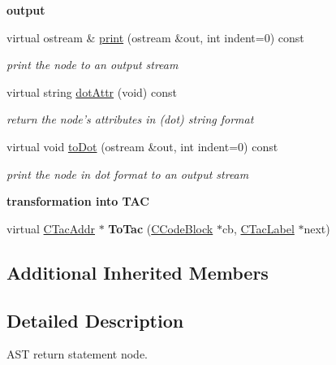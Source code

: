\begin{Indent}{\bf output}\par
\begin{DoxyCompactItemize}
\item 
virtual ostream \& \hyperlink{classCAstStatReturn_afcfe8b2012f465d3ea659f738ba157d5}{print} (ostream \&out, int indent=0) const 
\begin{DoxyCompactList}\small\item\em print the node to an output stream \end{DoxyCompactList}\item 
virtual string \hyperlink{classCAstStatReturn_af2265486c79dbea4d3945a65054a9e98}{dot\-Attr} (void) const 
\begin{DoxyCompactList}\small\item\em return the node's attributes in (dot) string format \end{DoxyCompactList}\item 
virtual void \hyperlink{classCAstStatReturn_a17aa6c19765d76eb16ffb9491a44c89f}{to\-Dot} (ostream \&out, int indent=0) const 
\begin{DoxyCompactList}\small\item\em print the node in dot format to an output stream \end{DoxyCompactList}\end{DoxyCompactItemize}
\end{Indent}
\begin{Indent}{\bf transformation into T\-A\-C}\par
\begin{DoxyCompactItemize}
\item 
\hypertarget{classCAstStatReturn_ab7906222701d30230bfedbf3a613ed86}{virtual \hyperlink{classCTacAddr}{C\-Tac\-Addr} $\ast$ {\bfseries To\-Tac} (\hyperlink{classCCodeBlock}{C\-Code\-Block} $\ast$cb, \hyperlink{classCTacLabel}{C\-Tac\-Label} $\ast$next)}\label{classCAstStatReturn_ab7906222701d30230bfedbf3a613ed86}

\end{DoxyCompactItemize}
\end{Indent}
\subsection*{Additional Inherited Members}


\subsection{Detailed Description}
A\-S\-T return statement node. 

